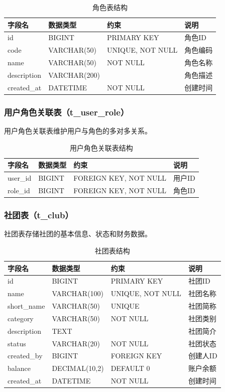 \begin{table}[H]
\centering
\caption{角色表结构}
\begin{tabular}{llll}
\toprule
字段名 & 数据类型 & 约束 & 说明 \\
\midrule
id & BIGINT & PRIMARY KEY & 角色ID \\
code & VARCHAR(50) & UNIQUE, NOT NULL & 角色编码 \\
name & VARCHAR(50) & NOT NULL & 角色名称 \\
description & VARCHAR(200) & & 角色描述 \\
created\_at & DATETIME & NOT NULL & 创建时间 \\
\bottomrule
\end{tabular}
\end{table}

\subsubsection{用户角色关联表（t\_user\_role）}

用户角色关联表维护用户与角色的多对多关系。

\begin{table}[H]
\centering
\caption{用户角色关联表结构}
\begin{tabular}{llll}
\toprule
字段名 & 数据类型 & 约束 & 说明 \\
\midrule
user\_id & BIGINT & FOREIGN KEY, NOT NULL & 用户ID \\
role\_id & BIGINT & FOREIGN KEY, NOT NULL & 角色ID \\
\bottomrule
\end{tabular}
\end{table}

\subsubsection{社团表（t\_club）}

社团表存储社团的基本信息、状态和财务数据。

\begin{table}[H]
\centering
\caption{社团表结构}
\begin{tabular}{llll}
\toprule
字段名 & 数据类型 & 约束 & 说明 \\
\midrule
id & BIGINT & PRIMARY KEY & 社团ID \\
name & VARCHAR(100) & UNIQUE, NOT NULL & 社团名称 \\
short\_name & VARCHAR(50) & UNIQUE & 社团简称 \\
category & VARCHAR(50) & NOT NULL & 社团类别 \\
description & TEXT & & 社团简介 \\
status & VARCHAR(20) & NOT NULL & 社团状态 \\
created\_by & BIGINT & FOREIGN KEY & 创建人ID \\
balance & DECIMAL(10,2) & DEFAULT 0 & 账户余额 \\
created\_at & DATETIME & NOT NULL & 创建时间 \\
\bottomrule
\end{tabular}
\end{table}

